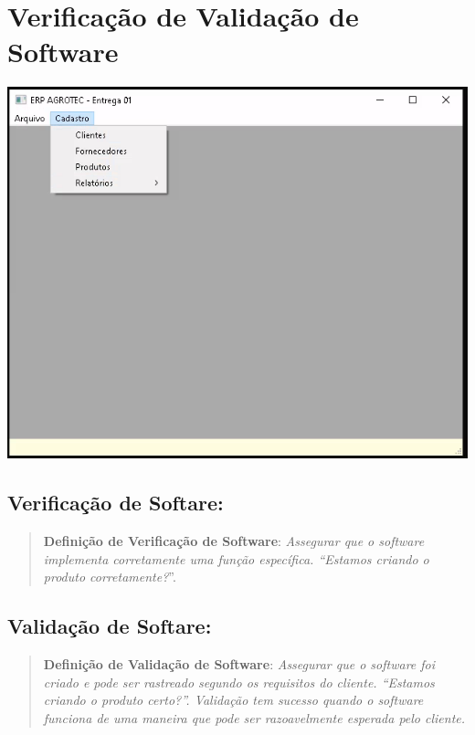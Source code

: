 \documentclass[
]{book}
\begin{document}
\chapter{Verificação de Validação de Software}\label{verificauxe7uxe3o-de-validauxe7uxe3o-de-software}

\includegraphics{images/clipboard-2445384906.png}

\section{Verificação de Softare:}\label{verificauxe7uxe3o-de-softare}

\begin{quote}
\textbf{Definição de Verificação de Software}: \emph{Assegurar que o software implementa corretamente uma função específica. ``Estamos criando o produto corretamente?}''.
\end{quote}

\section{Validação de Softare:}\label{validauxe7uxe3o-de-softare}

\begin{quote}
\textbf{Definição de Validação de Software}: \emph{Assegurar que o software foi criado e pode ser rastreado segundo os requisitos do cliente. ``Estamos criando o produto certo?''. Validação tem sucesso quando o software funciona de uma maneira que pode ser razoavelmente esperada pelo cliente.}
\end{quote}
\end{document}
